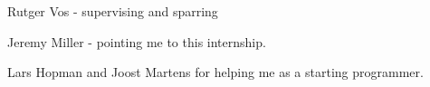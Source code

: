 Rutger Vos - supervising and sparring


Jeremy Miller - pointing me to this internship.


Lars Hopman and Joost Martens for helping me as a starting programmer.